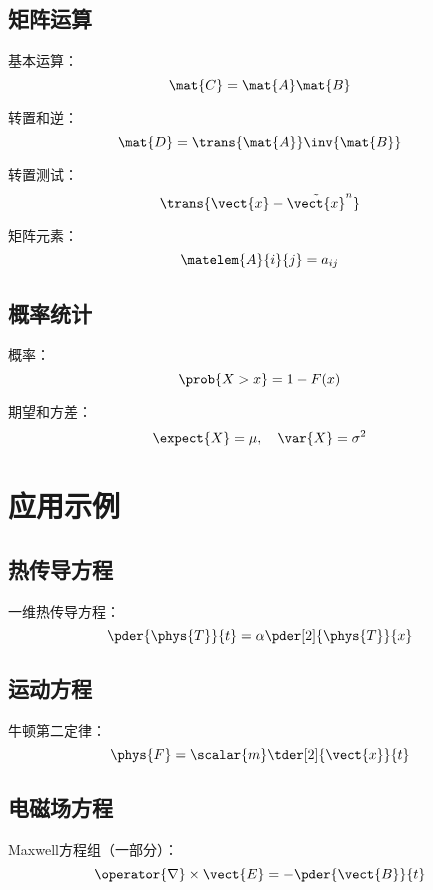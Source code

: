 \documentclass{article}
\begin{document}
\subsection{矩阵运算}

基本运算：
\[
    \mat{C} = \mat{A}\mat{B}
\]

转置和逆：
\[
    \mat{D} = \trans{\mat{A}}\inv{\mat{B}}
\]

转置测试：
\[
    \trans{\vect{x} - \tilde{\vect{x}}^n}
\]

矩阵元素：
\[
    \matelem{A}{i}{j} = a_{ij}
\]

\subsection{概率统计}

概率：
\[
    \prob{X > x} = 1 - F(x)
\]

期望和方差：
\[
    \expect{X} = \mu, \quad \var{X} = \sigma^2
\]

\section{应用示例}

\subsection{热传导方程}
一维热传导方程：
\[
    \pder{\phys{T}}{t} = \alpha \pder[2]{\phys{T}}{x}
\]

\subsection{运动方程}
牛顿第二定律：
\[
    \phys{F} = \scalar{m}\tder[2]{\vect{x}}{t}
\]

\subsection{电磁场方程}
Maxwell方程组（一部分）：
\[
    \operator{\nabla} \times \vect{E} = -\pder{\vect{B}}{t}
\]
\end{document}
